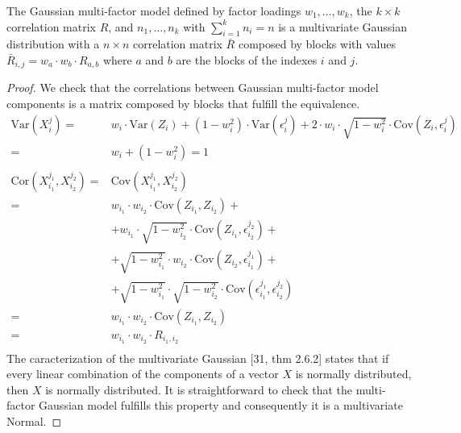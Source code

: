 \documentclass[11pt,fleqn]{book} %
\begin{document}
\begin{proposition}
\label{prop:gmfigs}
The Gaussian multi-factor model defined by factor loadings 
$w_1,\dots,w_k$, the $k \times k$ correlation matrix $R$, and
$n_1,\dots,n_k$ with $\sum_{i=1}^k n_i = n$ is a 
multivariate Gaussian distribution with a $n \times n$ correlation
matrix $\bar{R}$ composed by blocks with values
$\bar{R}_{i,j} = w_a \cdot w_b \cdot R_{a,b}$ where $a$ and $b$ 
are the blocks of the indexes $i$ and $j$.
\end{proposition}
\begin{proof}
We check that the correlations between Gaussian multi-factor model
components is a matrix composed by blocks that fulfill the equivalence.
\begin{displaymath}
\begin{array}{rl}
\text{Var}(X_i^j) = &
  w_i \cdot \text{Var}(Z_i) + (1-w_i^2) \cdot \text{Var}(\epsilon_i^j) +
  2 \cdot w_i \cdot \sqrt{1-w_i^2} \cdot \text{Cov}(Z_i, \epsilon_i^j) \\
= & w_i + (1-w_i^2) = 1 \\
 & \\
\text{Cor}(X_{i_1}^{j_1},X_{i_2}^{j_2}) = & \text{Cov}(X_{i_1}^{j_1},X_{i_2}^{j_2}) \\
= & w_{i_1} \cdot w_{i_2} \cdot \text{Cov}(Z_{i_1},Z_{i_2}) + \\
&   + w_{i_1} \cdot \sqrt{1-w_{i_2}^2} \cdot \text{Cov}(Z_{i_1}, \epsilon_{i_2}^{j_2}) + \\
&   + \sqrt{1-w_{i_1}^2} \cdot w_{i_2} \cdot \text{Cov}(Z_{i_2}, \epsilon_{i_1}^{j_1}) + \\
&   + \sqrt{1-w_{i_1}^2} \cdot \sqrt{1-w_{i_2}^2} \cdot \text{Cov}(\epsilon_{i_1}^{j_1}, \epsilon_{i_2}^{j_2}) \\
= & w_{i_1} \cdot w_{i_2} \cdot \text{Cov}(Z_{i_1}, Z_{i_2}) \\
= & w_{i_1} \cdot w_{i_2} \cdot R_{i_1,i_2} \\
\end{array}
\end{displaymath}
The caracterization of the multivariate Gaussian [31, thm 2.6.2]
states that if every linear combination of the components of a 
vector $X$ is normally distributed, then $X$ is normally distributed.
It is straightforward to check that the multi-factor Gaussian model 
fulfills this property and consequently it is a multivariate Normal.
\end{proof}
\end{document}

